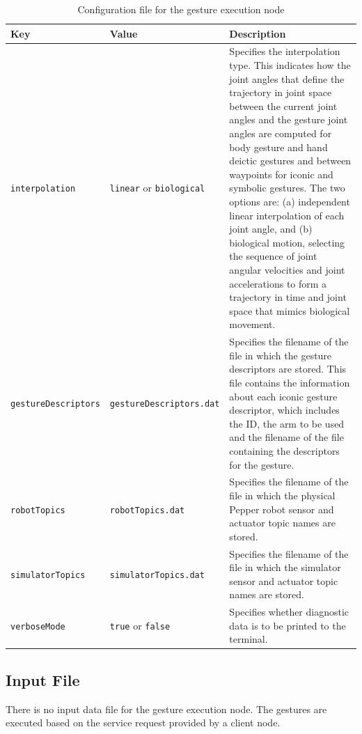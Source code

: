 \documentclass{CSSRforAfrica}
\begin{document}
\begin{longtable}[c]{|l|l|p{7cm}|}
    \caption{Configuration file for the gesture execution node} \label{tab:config_file}\\
    \hline
    \rowcolor{gray!30}
    \small{\textbf{Key}} & \small{\textbf{Value}} & \small{\textbf{Description}} \\ \hline
    \endhead %
    

\footnotesize{\texttt{interpolation}} & \footnotesize{\texttt{linear}} or \texttt{biological} & \footnotesize{Specifies the interpolation type. This indicates how the joint angles that define the trajectory in
joint space between the current joint angles and the gesture joint angles are computed for body gesture and hand deictic gestures and between waypoints for iconic and symbolic gestures. The two options are: (a) independent linear interpolation of each joint angle, and (b) biological motion, selecting the sequence of joint angular velocities and joint accelerations to form a trajectory in time and joint space that mimics biological movement.} \\ \hline
 \footnotesize{\texttt{gestureDescriptors}} & \footnotesize{\texttt{gestureDescriptors.dat}}  & \footnotesize{Specifies the filename of the file in which the gesture descriptors are stored. This file contains the information about each iconic gesture descriptor, which includes the ID, the arm to be used and the filename of the file containing the descriptors for the gesture.} \\ \hline
    \footnotesize{\texttt{robotTopics}} & \footnotesize{\texttt{robotTopics.dat}} & \footnotesize{Specifies the filename of the file in which the physical Pepper robot sensor and actuator topic names are stored.} \\ \hline
    \footnotesize{\texttt{simulatorTopics}} & \footnotesize{\texttt{simulatorTopics.dat}} & \footnotesize{Specifies the filename of the file in which the simulator sensor and actuator topic names are stored.} \\ \hline
 \footnotesize{\texttt{verboseMode}} & \footnotesize{\texttt{true}} or \texttt{false} & \footnotesize{Specifies whether diagnostic data is to be printed to the terminal.} \\ \hline
\end{longtable}

\subsection*{Input File}
There is no input data file for the gesture execution node. The gestures are executed based on the service request provided by a client node.
\end{document}
